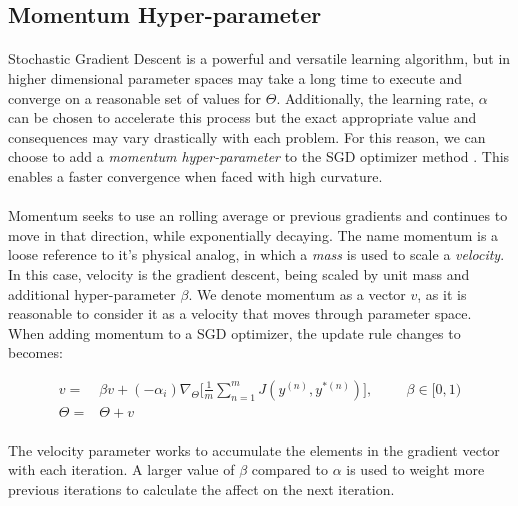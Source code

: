 \documentclass[12pt,letterpaper]{article}
\begin{document}
\subsection{Momentum Hyper-parameter}

\paragraph*{}Stochastic Gradient Descent is a powerful and versatile learning algorithm, but in higher dimensional parameter spaces may take a long time to execute and converge on a reasonable set of values for $\Theta$. Additionally, the learning rate, $\alpha$ can be chosen to accelerate this process but the exact appropriate value and consequences may vary drastically with each problem. For this reason, we can choose to add a \textit{momentum hyper-parameter} to the SGD optimizer method \cite{Geron}. This enables a faster convergence when faced with high curvature. 

\paragraph*{}Momentum seeks to use an rolling average or previous gradients and continues to move in that direction, while exponentially decaying.  The name momentum is a loose reference to it's physical analog, in which a \textit{mass} is used to scale a \textit{velocity}. In this case, velocity is the gradient descent, being scaled by unit mass and additional hyper-parameter $\beta$. We denote momentum as a vector $v$, as it is reasonable to consider it as a velocity that moves through parameter space. When adding momentum to a SGD optimizer, the update rule changes to becomes:

\begin{equation}
\label{momentum update}
\begin{split}
v =&  \beta v + (-\alpha_i)\nabla_{\Theta} \Big[ \frac{1}{m} \sum_{n=1}^{m} J(y^{(n)},y^{*(n)}) \Big] ,
\hspace{1cm} \beta \in [0,1) \\
\Theta =&  \Theta + v
\end{split} 
\end{equation}


\paragraph*{}The velocity parameter works to accumulate the elements in the gradient vector with each iteration. A larger value of $\beta$ compared to 
$\alpha$ is used to weight more previous iterations to calculate the affect on the next iteration.
\end{document}
